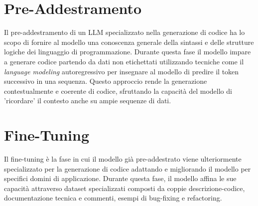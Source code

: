 \documentclass[12pt,a4paper,openright,twoside]{book}
\begin{document}
\section{Pre-Addestramento}
Il pre-addestramento di un LLM specializzato nella generazione di codice ha lo scopo di fornire al modello una conoscenza generale della sintassi e delle strutture logiche dei linguaggio di programmazione.
Durante questa fase il modello impare a generare codice partendo da dati non etichettati utilizzando tecniche come il \emph{language modeling} autoregressivo per insegnare al modello di predire il token successivo in una sequenza.
Questo approccio rende la generazione contestualmente e coerente di codice, sfruttando la capacità del modello di 'ricordare' il contesto anche su ampie sequenze di dati.
\section{Fine-Tuning}
Il fine-tuning è la fase in cui il modello già pre-addestrato viene ulteriormente specializzato per la generazione di codice adattando e migliorando il modello per specifici domini di applicazione.
Durante questa fase, il modello affina le sue capacità attraverso dataset specializzati composti da coppie descrizione-codice, documentazione tecnica e commenti, esempi di bug-fixing e refactoring.
\end{document}
